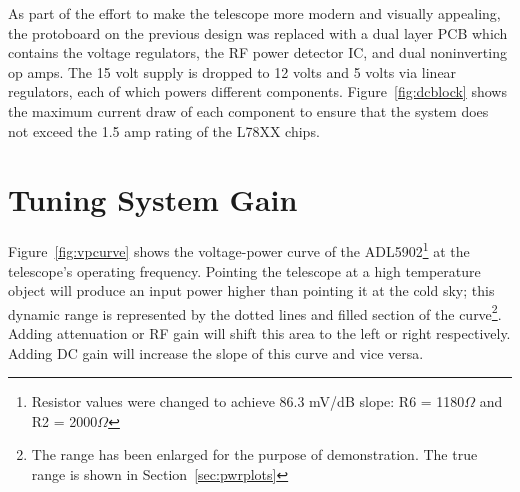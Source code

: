 \documentclass[titlepage]{article}
\begin{document}
As part of the effort to make the telescope more modern and visually appealing, the protoboard on the previous design was replaced with a dual layer PCB which contains the voltage regulators, the RF power detector IC, and dual noninverting op amps. The 15 volt supply is dropped to 12 volts and 5 volts via linear regulators, each of which powers different components. Figure~\ref{fig:dcblock} shows the maximum current draw of each component to ensure that the system does not exceed the 1.5 amp rating of the L78XX chips.


\section{Tuning System Gain}
\label{sec:tuning}
Figure~\ref{fig:vpcurve} shows the voltage-power curve of the ADL5902\footnote{Resistor values were changed to achieve 86.3 mV/dB slope: R6 = 1180$\Omega$ and R2 = 2000$\Omega$} at the telescope's operating frequency. Pointing the telescope at a high temperature object will produce an input power higher than pointing it at the cold sky; this dynamic range is represented by the dotted lines and filled section of the curve\footnote{The range has been enlarged for the purpose of demonstration. The true range is shown in Section~\ref{sec:pwrplots}}. Adding attenuation or RF gain will shift this area to the left or right respectively. Adding DC gain will increase the slope of this curve and vice versa.
\end{document}
